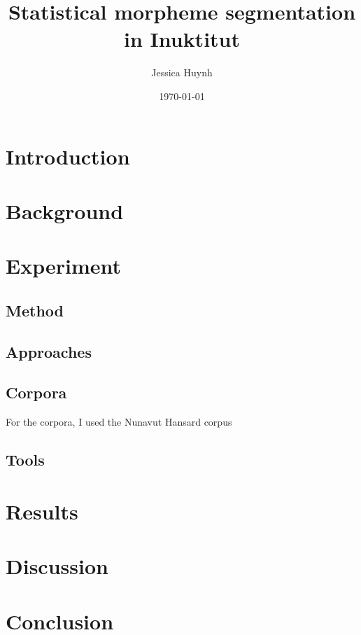 \documentclass[10pt]{article}
\title{Statistical morpheme segmentation in Inuktitut}
\author{Jessica Huynh}
\date{\today}
\begin{document}
	
\maketitle

\onehalfspacing

\section{Introduction}

\section{Background}

\section{Experiment}
\cite{analyzer}

\subsection{Method}

\subsection{Approaches}

\subsection{Corpora}
For the corpora, I used the Nunavut Hansard corpus\cite{hansard}

\subsection{Tools}

\section{Results}

\section{Discussion}

\section{Conclusion}

\pagebreak


\end{document}
